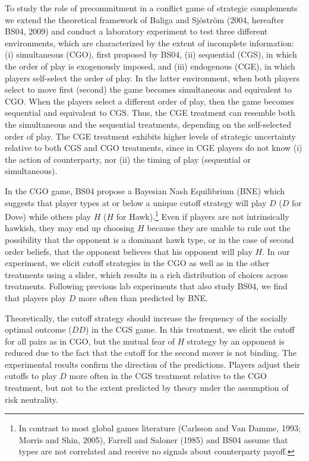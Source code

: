 \documentclass[12pt, letterpaper]{article}
\theoremstyle{plain}
\begin{document}
To study the role of precommitment in a conflict game of strategic complements we extend the theoretical framework of Baliga and Sj\"ostr\"om (2004, hereafter BS04, 2009) and conduct a laboratory experiment to test three different environments, which are characterized by the extent of incomplete information: (i) simultaneous (CGO), first proposed by BS04, (ii) sequential (CGS), in which the order of play is exogenously imposed, and (iii) endogenous (CGE), in which players self-select the order of play. In the latter environment, when both players select to move first (second) the game becomes simultaneous and equivalent to CGO. When the players select a different order of play, then the game becomes sequential and equivalent to CGS. Thus, the CGE treatment can resemble both the simultaneous and the sequential treatments, depending on the self-selected order of play. The CGE treatment exhibits higher levels of strategic uncertainty relative to both CGS and CGO treatments, since in CGE players do not know (i) the action of counterparty, nor (ii) the timing of play (sequential or simultaneous). 

In the CGO game, BS04 propose a Bayesian Nash Equilibrium (BNE) which suggests that player types at or below a unique cutoff strategy will play $D$ ($D$ for Dove) while others play $H$ ($H$ for Hawk).\footnote{In contrast to most global games literature (Carlsson and Van Damme, 1993; Morris and Shin, 2005), Farrell and Saloner (1985) and BS04 assume that types are not correlated and receive no signals about counterparty payoff. } Even if players are not intrinsically hawkish, they may end up choosing $H$ because they are unable to rule out the possibility that the opponent is a dominant hawk type, or in the case of second order beliefs, that the opponent believes that his opponent will play $H$. In our experiment, we elicit cutoff strategies in the CGO as well as in the other treatments using a slider, which results in a rich distribution of choices across treatments. Following previous lab experiments that also study BS04, we find that players play $D$ more often than predicted by BNE. 

Theoretically, the cutoff strategy should increase the frequency of the socially optimal outcome ($DD$) in the CGS game. In this treatment, we elicit the cutoff for all pairs as in CGO, but the mutual fear of $H$ strategy by an opponent is reduced due to the fact that the cutoff for the second mover is not binding. The experimental results confirm the direction of the predictions. Players adjust their cutoffs to play $D$ more often in the CGS treatment relative to the CGO treatment, but not to the extent predicted by theory under the assumption of risk neutrality.
\end{document}
